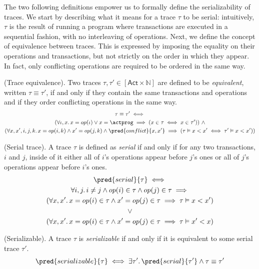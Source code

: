 The two following definitions empower us to formally define the serializability of traces. We start by describing what it means for a trace $\tau$ to be serial: intuitively, $\tau$ is the result of running a program where transactions are executed in a sequential fashion, with no interleaving of operations. Next, we define the concept of equivalence between traces. This is expressed by imposing the equality on their operations and transactions, but not strictly on the order in which they appear. In fact, only conflicting operations are required to be ordered in the same way.

\begin{defn}
	(Trace equivalence).
	Two traces $\tau, \tau' \in [\mathsf{Act} \times \mathds{N}]$ are defined to be \emph{equivalent}, written $\tau \equiv \tau'$, if and only if they contain the same transactions and operations and if they order conflicting operations in the same way.
	\begin{gather*}
		\tau \equiv \tau' \iff \\
		(\forall \iota, x \ldotp x = op(\iota) \lor x = \actprog \implies (x \in \tau \iff x \in \tau'))\ \land \\
		(\forall x, x', i, j, k \ldotp x = op(i, k) \land x' = op(j, k) \land \pred{conflict}{x, x'}
		\implies (\tau \vDash x < x' \iff \tau' \vDash x < x'))
	\end{gather*}
\end{defn}

\begin{defn}
	(Serial trace).
	A trace $\tau$ is defined as \emph{serial} if and only if for any two transactions, $i$ and $j$, inside of it either all of $i$'s operations appear before $j$'s ones or all of $j$'s operations appear before $i$'s ones.
	\begin{gather*}
		\pred{serial}{\tau} \iff \\
		\forall i, j \ldotp i \neq j \land op(i) \in \tau \land op(j) \in \tau \implies \\
		(\forall x, x' \ldotp x = op(i) \in \tau \land x' = op(j) \in \tau \implies \tau \vDash x < x') \\
		\lor \\
		(\forall x, x' \ldotp x = op(i) \in \tau \land x' = op(j) \in \tau \implies \tau \vDash x' < x)
	\end{gather*}
\end{defn}

\begin{defn}
	(Serializable).
	A trace $\tau$ is \emph{serializable} if and only if it is equivalent to some serial trace $\tau'$.
	\[
		\pred{serializable}{\tau} \iff \exists \tau' \ldotp \pred{serial}{\tau'} \land \tau \equiv \tau'
	\]
\end{defn}


